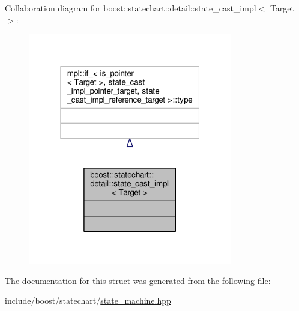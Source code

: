 Collaboration diagram for boost\+:\+:statechart\+:\+:detail\+:\+:state\+\_\+cast\+\_\+impl$<$ Target $>$\+:
\nopagebreak
\begin{figure}[H]
\begin{center}
\leavevmode
\includegraphics[width=253pt]{structboost_1_1statechart_1_1detail_1_1state__cast__impl__coll__graph}
\end{center}
\end{figure}


The documentation for this struct was generated from the following file\+:\begin{DoxyCompactItemize}
\item 
include/boost/statechart/\mbox{\hyperlink{state__machine_8hpp}{state\+\_\+machine.\+hpp}}\end{DoxyCompactItemize}
